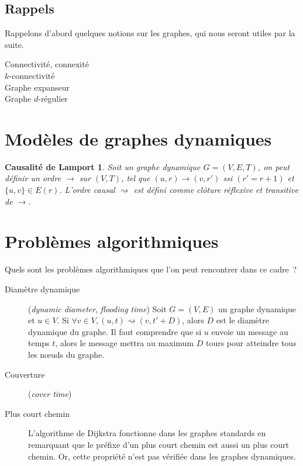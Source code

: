 \documentclass[12pt,a4paper]{article}
\begin{document}
\subsection{Rappels}
Rappelons d'abord quelques notions sur les graphes, qui nous seront
utiles par la suite.

\begin{description}
\item[Connectivité, connexité]
\item[\(k\)-connectivité]
\item[Graphe expanseur]
\item[Graphe \(d\)-régulier]
\end{description}

\section{Modèles de graphes dynamiques}

\newtheorem{lamport_causality}{Causalité de Lamport}
\begin{lamport_causality}
  Soit un graphe dynamique \(G = (V, E, T)\), on peut définir un ordre
  \(\rightarrow\) sur \((V, T)\), tel que
  \((u, r) \rightarrow (v, r')\) ssi \((r' = r + 1)\) et
  \(\{u, v\} \in E(r)\). L'\textit{ordre causal} \(\rightsquigarrow\)
  est défini comme clôture réflexive et transitive de \(\rightarrow\).
\end{lamport_causality}

\section{Problèmes algorithmiques}

Quels sont les problèmes algorithmiques que l'on peut rencontrer dans
ce cadre~?

\begin{description}
  \item[Diamètre dynamique] (\textit{dynamic diameter},
    \textit{flooding time}) Soit \(G = (V, E)\) un graphe dynamique et
    \(u \in V\). Si \(\forall v \in V, (u, t) \rightsquigarrow (v, t' + D)\),
    alors \(D\) est le diamètre dynamique du graphe. Il faut
    comprendre que si \(u\) envoie un message au temps \(t\), alors le
    message mettra au maximum \(D\) tours pour atteindre tous les
    nœuds du graphe.
  \item[Couverture] (\textit{cover time})
  \item[Plus court chemin] L'algorithme de Dijkstra fonctionne dans
    les graphes standards en remarquant que le préfixe d'un plus court
    chemin est aussi un plus court chemin. Or, cette propriété n'est
    pas vérifiée dans les graphes dynamiques.
\end{description}
\end{document}
